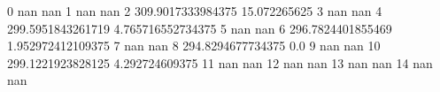 0 nan nan
1 nan nan
2 309.9017333984375 15.072265625
3 nan nan
4 299.5951843261719 4.765716552734375
5 nan nan
6 296.7824401855469 1.952972412109375
7 nan nan
8 294.8294677734375 0.0
9 nan nan
10 299.1221923828125 4.292724609375
11 nan nan
12 nan nan
13 nan nan
14 nan nan
